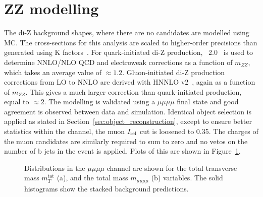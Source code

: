 \section{ZZ modelling}
\label{sec:zz_modelling}

The di-Z background shapes, where there are no \jtth candidates are modelled using \ac{MC}.
The cross-sections for this analysis are scaled to higher-order precisions than generated using K factors~\cite{CMS:2021ugl}.
For quark-initiated di-Z production, \POWHEG~2.0~\cite{Nason:2004rx,Frixione:2007vw,Alioli:2010xd,Jezo:2015aia} is used to determine \ac{NNLO}/\ac{NLO} \ac{QCD} and electroweak corrections as a function of $m_{ZZ}$, which takes an average value of $\approx 1.2$.
Gluon-initiated di-Z production corrections from \ac{LO} to \ac{NNLO} are derived with HNNLO v2~\cite{PhysRevLett.98.222002}, again as a function of $m_{ZZ}$.
This gives a much larger correction than quark-initiated production, equal to $\approx 2$.
The modelling is validated using a $\mu\mu\mu\mu$ final state and good agreement is observed between data and simulation.
Identical object selection is applied as stated in Section~\ref{sec:object_reconstruction}, except to ensure better statistics within the channel, the muon $I_{\text{rel}}$ cut is loosened to 0.35.
The charges of the muon candidates are similarly required to sum to zero and no vetos on the number of b jets in the event is applied.
Plots of this are shown in Figure~\ref{fig:4tau_mmmm}. \\

\begin{figure}[!hbtp]
\centering
\caption[Plots of the distributions in the $\mu\mu\mu\mu$ channel.]{Distributions in the $\mu\mu\mu\mu$ channel are shown for the total transverse mass $m_{T}^{\text{tot}}$ (a), and the total mass $m_{\mu\mu\mu\mu}$ (b) variables. The solid histograms show the stacked background predictions.}
\label{fig:4tau_mmmm}
\end{figure}


